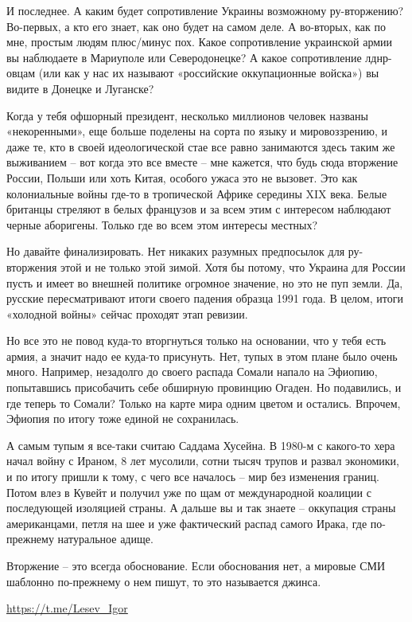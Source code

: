 И последнее. А каким будет сопротивление Украины возможному ру-вторжению?
Во-первых, а кто его знает, как оно будет на самом деле. А во-вторых, как по
мне, простым людям плюс/минус пох. Какое сопротивление украинской армии вы
наблюдаете в Мариуполе или Северодонецке? А какое сопротивление лднр-овцам (или
как у нас их называют «российские оккупационные войска») вы видите в Донецке и
Луганске?

Когда у тебя офшорный президент, несколько миллионов человек названы
«некоренными», еще больше поделены на сорта по языку и мировоззрению, и даже
те, кто в своей идеологической стае все равно занимаются здесь таким же
выживанием – вот когда это все вместе – мне кажется, что будь сюда вторжение
России, Польши или хоть Китая, особого ужаса это не вызовет. Это как
колониальные войны где-то в тропической Африке середины XIX века. Белые
британцы стреляют в белых французов и за всем этим с интересом наблюдают черные
аборигены. Только где во всем этом интересы местных?

Но давайте финализировать. Нет никаких разумных предпосылок для ру-вторжения
этой и не только этой зимой. Хотя бы потому, что Украина для России пусть и
имеет во внешней политике огромное значение, но это не пуп земли. Да, русские
пересматривают итоги своего падения образца 1991 года. В целом, итоги «холодной
войны» сейчас проходят этап ревизии.

Но все это не повод куда-то вторгнуться только на основании, что у тебя есть
армия, а значит надо ее куда-то присунуть. Нет, тупых в этом плане было очень
много. Например, незадолго до своего распада Сомали напало на Эфиопию,
попытавшись присобачить себе обширную провинцию Огаден. Но подавились, и где
теперь то Сомали? Только на карте мира одним цветом и остались. Впрочем,
Эфиопия по итогу тоже единой не сохранилась.

А самым тупым я все-таки считаю Саддама Хусейна. В 1980-м с какого-то хера
начал войну с Ираном, 8 лет мусолили, сотни тысяч трупов и развал экономики, и
по итогу пришли к тому, с чего все началось – мир без изменения границ. Потом
влез в Кувейт и получил уже по щам от международной коалиции с последующей
изоляцией страны. А дальше вы и так знаете – оккупация страны американцами,
петля на шее и уже фактический распад самого Ирака, где по-прежнему натуральное
адище.

Вторжение – это всегда обоснование. Если обоснования нет, а мировые СМИ
шаблонно по-прежнему о нем пишут, то это называется джинса.

\url{https://t.me/Lesev_Igor}

